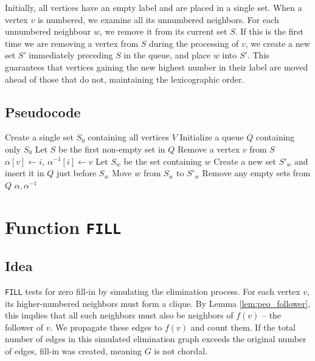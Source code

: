 Initially, all vertices have an empty label and are placed in a single set. When a vertex $v$ is numbered, we examine all its unnumbered neighbors. For each unnumbered neighbour $w$, we remove it from its current set $S$. If this is the first time we are removing a vertex from $S$ during the processing of $v$, we create a new set $S'$ immediately preceding $S$ in the queue, and place $w$ into $S'$. This guarantees that vertices gaining the new highest number in their label are moved ahead of those that do not, maintaining the lexicographic order.

\subsection{Pseudocode}

\begin{algorithm}[H]
\caption{Lexicographic Breadth-First Search (\texttt{LexBFS})}
\begin{algorithmic}[1]
    \State Create a single set $S_0$ containing all vertices $V$
    \State Initialize a queue $Q$ containing only $S_0$
        \State Let $S$ be the first non-empty set in $Q$
        \State Remove a vertex $v$ from $S$
        \State $\alpha[v] \gets i, \ \alpha^{-1}[i] \gets v$
            \State Let $S_w$ be the set containing $w$
                \State Create a new set $S'_w$ and insert it in $Q$ just before $S_w$
            \EndIf
            \State Move $w$ from $S_w$ to $S'_w$
        \EndFor
        \State Remove any empty sets from $Q$
    \EndFor
    \State \Return $\alpha, \alpha^{-1}$
\EndFunction
\end{algorithmic}
\end{algorithm}

\section{Function \texttt{FILL}}

\subsection{Idea}
\texttt{FILL} tests for zero fill-in by simulating the elimination process. For each vertex $v$, its higher-numbered neighbors must form a clique. By Lemma \ref{lem:peo_follower}, this implies that all such neighbors must also be neighbors of $f(v)$ -- the follower of $v$. We propagate these edges to $f(v)$ and count them. If the total number of edges in this simulated elimination graph exceeds the original number of edges, fill-in was created, meaning $G$ is not chordal.


